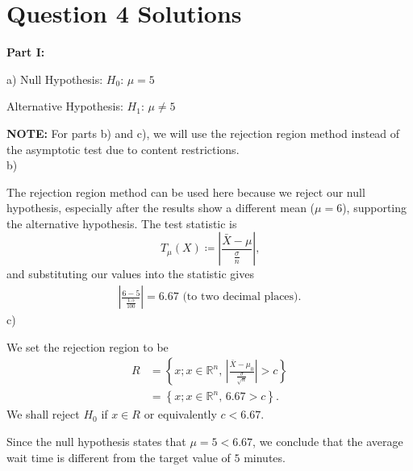 \documentclass{article}
\begin{document}
\section*{Question 4 Solutions} %
\textbf{Part I:}

a)
Null Hypothesis: $H_0\mbox{: }\mu = 5$

Alternative Hypothesis: $H_1\mbox{: }\mu \neq 5$

\textbf{NOTE:} For parts b) and c), we will use the rejection region method instead of the asymptotic test due to content restrictions.\\
b)

The rejection region method can be used here because we reject our null hypothesis, especially after the results show a different mean ($\mu = 6$), supporting the alternative hypothesis. The test statistic is
\[T_{\mu}(X)\coloneqq \left|\frac{\bar{X}-\mu}{\frac{\sigma}{n}}\right|\mbox{,}\]
\hspace*{6mm}and substituting our values into the statistic gives
\begin{align*}
    \left|\frac{6 - 5}{\frac{1.5}{100}}\right| = 6.67\mbox{ (to two decimal places).}
\end{align*}
c)

We set the rejection region to be
\begin{align*}
    R &= \left\{x; x\in\mathbb{R}^n\mbox{, }\left|\frac{\bar{X} - \mu_0}{\frac{\sigma}{\sqrt{n}}}\right| > c\right\}\\
    &= \left\{x; x\in\mathbb{R}^n\mbox{, }6.67 > c\right\}\mbox{.}
\end{align*}
We shall reject $H_0$ if $x\in R$ or equivalently $c < 6.67$.

Since the null hypothesis states that $\mu = 5 < 6.67$, we conclude that the average wait time is different from the target value of $5$ minutes.
\end{document}
